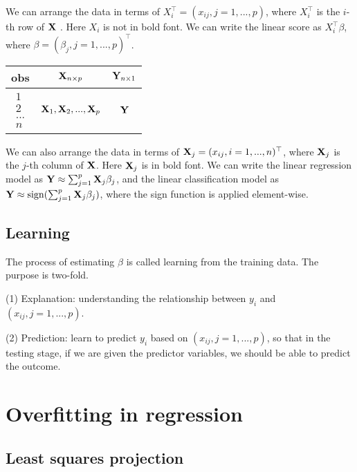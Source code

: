 \documentclass[11pt]{article}
\def\T{{\top}}
\def\T{{\top}}
\def\X{{\bf X}}
\def\Y{{\bf Y}}
\begin{document}
We can arrange the data in terms of $X_i^\T = (x_{ij}, j = 1, ..., p)$, where $X_i^\T$ is the $i$-th row of $\X$ . Here $X_i$ is not in bold font.  We can write the linear score as $X_i^\T \beta$, where $\beta = (\beta_{j}, j = 1, ..., p)^\T$.

\begin{table}[h]
\centering
\begin{tabular}{|c|c|c|}
\hline
 obs & $\X_{n\times p}$ & $\Y_{n\times 1}$ \\
\hline\hline
$\begin{matrix} 1\\ 2\\...\\ n \end{matrix}$  & $\X_1, \X_2, ..., \X_p$         & $\Y$ \\
\hline
\end{tabular}
\end{table}



We can also arrange the data in terms of $\X_j = (x_{ij}, i = 1, ..., n)^\T$, where $\X_j$ is the $j$-th column of $\X$. Here $\X_j$ is in bold font.  We can write the linear regression model as $\Y \approx \sum_{j=1}^{p} \X_j \beta_j$,  and the linear classification model as $\Y \approx {\rm sign} ( \sum_{j=1}^{p} \X_j \beta_j)$, where the sign function is applied element-wise. 

\subsection{Learning} 

The process of estimating $\beta$ is called learning from the training data. The purpose is two-fold. 

(1) Explanation: understanding the relationship between $y_i$ and $(x_{ij}, j = 1, ..., p)$. 

(2) Prediction: learn to predict $y_i$ based on $(x_{ij}, j = 1, ..., p)$, so that in the testing stage, if we are given the predictor variables, we should be able to predict the outcome. 


\section{Overfitting in regression} 

\subsection{Least squares projection}
\end{document}
